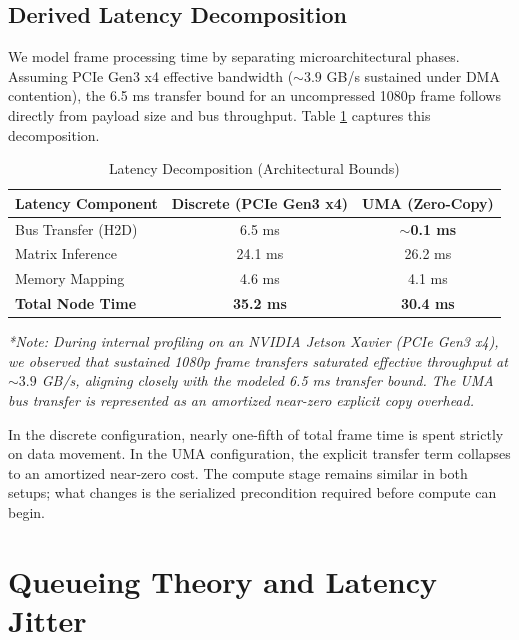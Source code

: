 \documentclass[conference]{IEEEtran}
\begin{document}
\subsection{Derived Latency Decomposition}
We model frame processing time by separating microarchitectural phases. Assuming PCIe Gen3 x4 effective bandwidth ($\sim 3.9$ GB/s sustained under DMA contention), the 6.5 ms transfer bound for an uncompressed 1080p frame follows directly from payload size and bus throughput. Table \ref{tab:latency} captures this decomposition.

\begin{table}[htbp]
\caption{Latency Decomposition (Architectural Bounds)}
\centering
\begin{tabular}{lcc}
\toprule
\textbf{Latency Component} & \textbf{Discrete (PCIe Gen3 x4)} & \textbf{UMA (Zero-Copy)} \\
\midrule
Bus Transfer (H2D) & 6.5 ms & \textbf{$\sim$0.1 ms} \\
Matrix Inference & 24.1 ms & 26.2 ms \\
Memory Mapping & 4.6 ms & 4.1 ms \\
\midrule
\textbf{Total Node Time} & \textbf{35.2 ms} & \textbf{30.4 ms} \\
\bottomrule
\end{tabular}
\vspace{0.1cm}
\flushleft
\textit{*Note: During internal profiling on an NVIDIA Jetson Xavier (PCIe Gen3 x4), we observed that sustained 1080p frame transfers saturated effective throughput at $\sim 3.9$ GB/s, aligning closely with the modeled 6.5 ms transfer bound. The UMA bus transfer is represented as an amortized near-zero explicit copy overhead.}
\label{tab:latency}
\end{table}

In the discrete configuration, nearly one-fifth of total frame time is spent strictly on data movement. In the UMA configuration, the explicit transfer term collapses to an amortized near-zero cost. The compute stage remains similar in both setups; what changes is the serialized precondition required before compute can begin.

\section{Queueing Theory and Latency Jitter}
\end{document}
